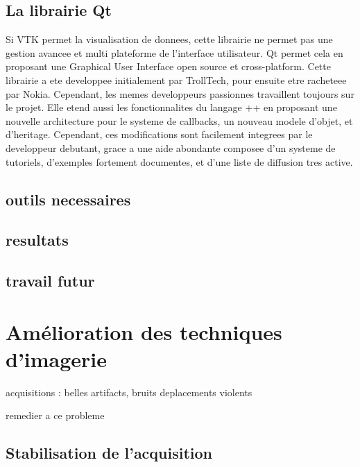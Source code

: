 \subsection{La librairie Qt}

Si VTK permet la visualisation de donnees, cette librairie ne permet pas une gestion avancee et multi plateforme de l'interface utilisateur. Qt permet cela en proposant une Graphical User Interface open source et cross-platform. Cette librairie a ete developpee initialement par TrollTech, pour ensuite etre racheteee par Nokia. Cependant, les memes developpeurs passionnes travaillent toujours sur le projet. 
Elle etend aussi les fonctionnalites du langage \C++ en proposant une nouvelle architecture pour le systeme de callbacks, un nouveau modele d'objet, et d'heritage. Cependant, ces modifications sont facilement integrees par le developpeur debutant, grace a une aide abondante composee d'un systeme de tutoriels, d'exemples fortement documentes, et d'une liste de diffusion tres active.



\subsection{outils necessaires}





\subsection{resultats}

\subsection{travail futur}





\section{Amélioration des techniques d'imagerie}


acquisitions :
belles
artifacts, bruits
deplacements violents

remedier a ce probleme

\subsection{Stabilisation de l'acquisition}

